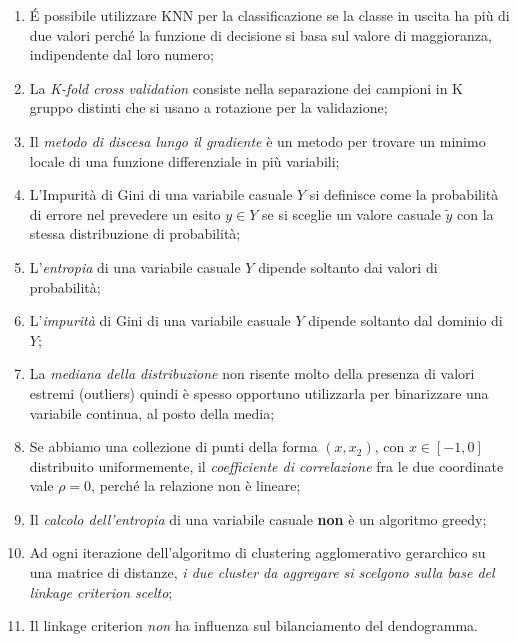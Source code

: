 \documentclass[a4paper]{article}
\begin{document}
\begin{enumerate}
	\item \'E possibile utilizzare KNN per la classificazione se la classe in uscita ha più di due valori perché la funzione di decisione si basa sul valore di maggioranza, indipendente dal loro numero;

	\item La \emph{K-fold cross validation} consiste nella separazione dei campioni in K gruppo distinti che si usano a rotazione per la validazione;

	\item Il \emph{metodo di discesa lungo il gradiente} è un metodo per trovare un minimo locale di una funzione differenziale in più variabili;

	\item L'Impurità di Gini di una variabile casuale \( Y \) si definisce come la probabilità di errore nel prevedere un esito \( y \in Y \) se si sceglie un valore casuale \( \tilde{y} \) con la stessa distribuzione di probabilità;

	\item L’\emph{entropia} di una variabile casuale \( Y \) dipende soltanto dai valori di probabilità;

	\item L’\emph{impurità} di Gini di una variabile casuale \( Y \) dipende soltanto dal dominio di \( Y \);

	\item La \emph{mediana della distribuzione} non risente molto della presenza di valori estremi (outliers) quindi è spesso opportuno utilizzarla per binarizzare una variabile continua, al posto della media;

	\item Se abbiamo una collezione di punti della forma \( (x, x_{2} ) \), con \( x \in [−1, 0] \) distribuito uniformemente, il \emph{coefficiente di correlazione} fra le due coordinate vale \( \rho = 0 \), perché la relazione non è lineare;

	\item Il \emph{calcolo dell’entropia} di una variabile casuale \textbf{non} è un algoritmo greedy;

	\item Ad ogni iterazione dell’algoritmo di clustering agglomerativo gerarchico su una matrice di distanze, \emph{i due cluster da aggregare si scelgono sulla base del linkage criterion scelto};

	\item Il linkage criterion \emph{non} ha influenza sul bilanciamento del dendogramma.

\end{enumerate}
\end{document}
